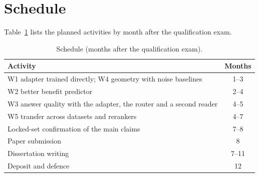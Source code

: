 \section{Schedule}
\label{sec:plan_schedule}

Table~\ref{tab:schedule} lists the planned activities by month after the qualification exam.

\begin{table}[htbp]
\centering
\caption{Schedule (months after the qualification exam).}
\label{tab:schedule}
\small
\begin{tabular}{lc}
\toprule
Activity & Months \\
\midrule
W1 adapter trained directly; W4 geometry with noise baselines & 1--3 \\
W2 better benefit predictor & 2--4 \\
W3 answer quality with the adapter, the router and a second reader & 4--5 \\
W5 transfer across datasets and rerankers & 4--7 \\
Locked-set confirmation of the main claims & 7--8 \\
Paper submission & 8 \\
Dissertation writing & 7--11 \\
Deposit and defence & 12 \\
\bottomrule
\end{tabular}
\end{table}
